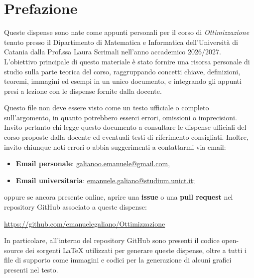 \chapter*{Prefazione}

\setlength{\parskip}{0.8em}
\setlength{\parindent}{0pt}

Queste dispense sono nate come appunti personali per il corso di \emph{Ottimizzazione} tenuto presso il Dipartimento di Matematica e Informatica dell'Universit\`a di Catania dalla Prof.ssa Laura Scrimali nell'anno accademico 2026/2027. L'obiettivo principale di questo materiale è stato fornire una risorsa personale di studio sulla parte teorica del corso, raggruppando concetti chiave, definizioni, teoremi, immagini ed esempi in un unico documento, e integrando gli appunti presi a lezione con le dispense fornite dalla docente.

Questo file non deve essere visto come un testo ufficiale o completo sull'argomento, in quanto potrebbero esserci errori, omissioni o imprecisioni. Invito pertanto chi legge questo documento a consultare le dispense ufficiali del corso proposte dalla docente ed eventuali testi di riferimento consigliati. Inoltre, invito chiunque noti errori o abbia suggerimenti a contattarmi via email:
\begin{itemize}
    \item \textbf{Email personale}: \href{mailto:galianoo.emanuele@gmail.com}{galianoo.emanuele@gmail.com},
    \item \textbf{Email universitaria}: \href{mailto:emanuele.galiano@studium.unict.it}{emanuele.galiano@studium.unict.it};
\end{itemize}

\noindent
oppure se ancora presente online, aprire una \textbf{issue} o una \textbf{pull request} nel repository GitHub associato a queste dispense:
\begin{center}
\begin{minipage}{0.92\textwidth}
\centering
\url{https://github.com/emanuelegaliano/Ottimizzazione}
\end{minipage}
\end{center}

In particolare, all'interno del repository GitHub sono presenti il codice open-source dei sorgenti \LaTeX{} utilizzati per generare queste dispense, oltre a tutti i file di supporto come immagini e codici per la generazione di alcuni grafici presenti nel testo.
